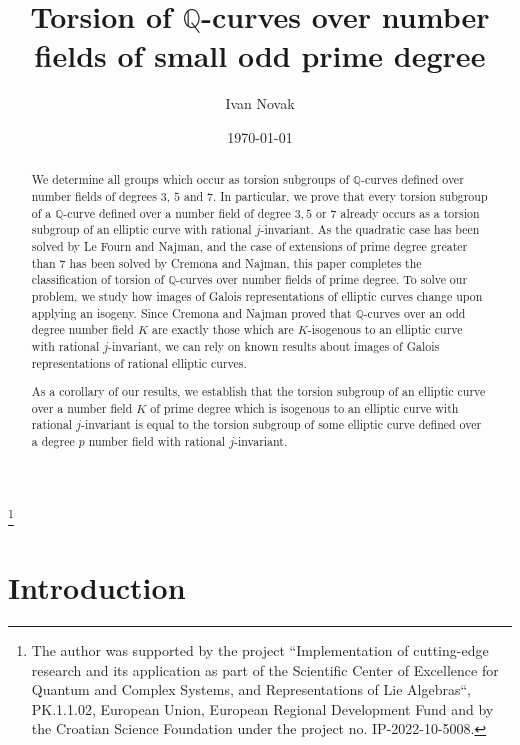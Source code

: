 \documentclass[10pt,leqno]{amsart}
\newcommand{\Q}{\mathbb{Q}}
\theoremstyle{definition}
\theoremstyle{remark}
\numberwithin{theorem}{section}
\begin{document}
\title{Torsion of $\Q$-curves over number fields of small odd prime degree} %
\author[Initial Surname]{Ivan Novak}
\date{\today}
\address{Faculty of Science, Department of Mathematics, Bijenička cesta 30, Zagreb, Croatia}
\thanks{The author was supported by the project “Implementation of cutting-edge research and its application as part of the Scientific Center of Excellence for Quantum and Complex Systems, and Representations of Lie Algebras“, PK.1.1.02, European Union, European Regional Development Fund and by the Croatian Science Foundation under the project no. IP-2022-10-5008.
}

\maketitle

\let\thefootnote\relax

\begin{abstract}
 We determine all groups which occur as torsion subgroups of $\Q$-curves defined over number fields of degrees $3$, $5$ and $7$.  In particular, we prove that every torsion subgroup of a $\Q$-curve defined over a number field of degree  $3,5$ or $7$ already occurs as a torsion subgroup of an elliptic curve with rational $j$-invariant.  As the quadratic case has been solved by Le Fourn and Najman, and the case of extensions of prime degree greater than $7$ has been solved by Cremona and Najman, this paper completes the classification of torsion of $\Q$-curves over number fields of prime degree. To solve our problem, we study how images of Galois representations of elliptic curves change upon applying an isogeny. Since Cremona and Najman proved that $\Q$-curves over an odd degree number field $K$ are exactly those which are $K$-isogenous to an elliptic curve with rational $j$-invariant, we can rely on known results about images of Galois representations of rational elliptic curves. 

 As a corollary of our results, we establish that the torsion subgroup of an elliptic curve over a number field $K$ of prime degree which is isogenous to an elliptic curve with rational $j$-invariant is equal to the torsion subgroup of some elliptic curve defined over a degree $p$ number field with rational $j$-invariant. 
\end{abstract} %

\bigskip

\section{Introduction}
\end{document}
